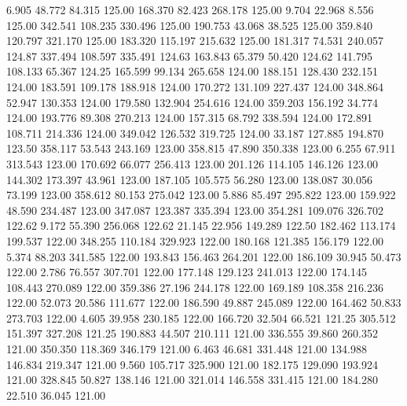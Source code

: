    6.905   48.772   84.315       125.00
 168.370   82.423  268.178       125.00
   9.704   22.968    8.556       125.00
 342.541  108.235  330.496       125.00
 190.753   43.068   38.525       125.00
 359.840  120.797  321.170       125.00
 183.320  115.197  215.632       125.00
 181.317   74.531  240.057       124.87
 337.494  108.597  335.491       124.63
 163.843   65.379   50.420       124.62
 141.795  108.133   65.367       124.25
 165.599   99.134  265.658       124.00
 188.151  128.430  232.151       124.00
 183.591  109.178  188.918       124.00
 170.272  131.109  227.437       124.00
 348.864   52.947  130.353       124.00
 179.580  132.904  254.616       124.00
 359.203  156.192   34.774       124.00
 193.776   89.308  270.213       124.00
 157.315   68.792  338.594       124.00
 172.891  108.711  214.336       124.00
 349.042  126.532  319.725       124.00
  33.187  127.885  194.870       123.50
 358.117   53.543  243.169       123.00
 358.815   47.890  350.338       123.00
   6.255   67.911  313.543       123.00
 170.692   66.077  256.413       123.00
 201.126  114.105  146.126       123.00
 144.302  173.397   43.961       123.00
 187.105  105.575   56.280       123.00
 138.087   30.056   73.199       123.00
 358.612   80.153  275.042       123.00
   5.886   85.497  295.822       123.00
 159.922   48.590  234.487       123.00
 347.087  123.387  335.394       123.00
 354.281  109.076  326.702       122.62
   9.172   55.390  256.068       122.62
  21.145   22.956  149.289       122.50
 182.462  113.174  199.537       122.00
 348.255  110.184  329.923       122.00
 180.168  121.385  156.179       122.00
   5.374   88.203  341.585       122.00
 193.843  156.463  264.201       122.00
 186.109   30.945   50.473       122.00
   2.786   76.557  307.701       122.00
 177.148  129.123  241.013       122.00
 174.145  108.443  270.089       122.00
 359.386   27.196  244.178       122.00
 169.189  108.358  216.236       122.00
  52.073   20.586  111.677       122.00
 186.590   49.887  245.089       122.00
 164.462   50.833  273.703       122.00
   4.605   39.958  230.185       122.00
 166.720   32.504   66.521       121.25
 305.512  151.397  327.208       121.25
 190.883   44.507  210.111       121.00
 336.555   39.860  260.352       121.00
 350.350  118.369  346.179       121.00
   6.463   46.681  331.448       121.00
 134.988  146.834  219.347       121.00
   9.560  105.717  325.900       121.00
 182.175  129.090  193.924       121.00
 328.845   50.827  138.146       121.00
 321.014  146.558  331.415       121.00
 184.280   22.510   36.045       121.00
